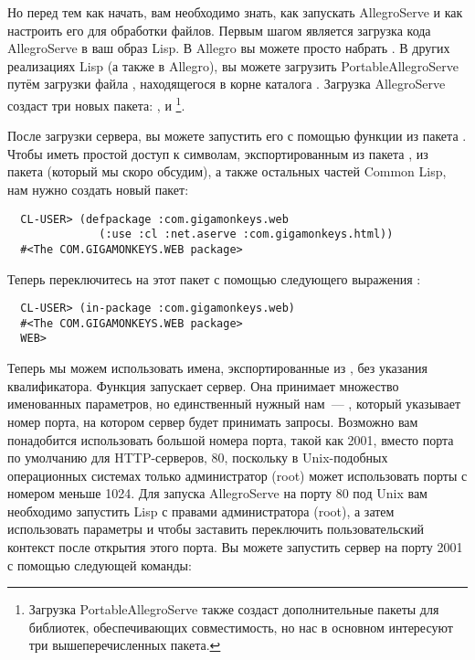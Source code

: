 Но перед тем как начать, вам необходимо знать, как запускать AllegroServe и как настроить
его для обработки файлов. Первым шагом является загрузка кода AllegroServe в ваш образ
Lisp. В Allegro вы можете просто набрать . В других реализациях
Lisp (а также в Allegro), вы можете загрузить PortableAllegroServe путём загрузки файла
, находящегося в корне каталога . Загрузка
AllegroServe создаст три новых пакета: ,  и
\footnote{Загрузка PortableAllegroServe также создаст
  дополнительные пакеты для библиотек, обеспечивающих совместимость, но нас в основном
  интересуют три вышеперечисленных пакета.}.

После загрузки сервера, вы можете запустить его с помощью функции  из пакета
. Чтобы иметь простой доступ к символам, экспортированным из пакета
, из пакета  (который мы скоро обсудим), а
также остальных частей Common Lisp, нам нужно создать новый пакет:

\begin{lstlisting}
  CL-USER> (defpackage :com.gigamonkeys.web
              (:use :cl :net.aserve :com.gigamonkeys.html))
  #<The COM.GIGAMONKEYS.WEB package>
\end{lstlisting}

Теперь переключитесь на этот пакет с помощью следующего выражения :

\begin{lstlisting}
  CL-USER> (in-package :com.gigamonkeys.web)
  #<The COM.GIGAMONKEYS.WEB package>
  WEB>
\end{lstlisting} 

Теперь мы можем использовать имена, экспортированные из , без указания
квалификатора. Функция  запускает сервер. Она принимает множество именованных
параметров, но единственный нужный нам~--- , который указывает номер порта, на
котором сервер будет принимать запросы.  Возможно вам понадобится использовать большой
номера порта, такой как 2001, вместо порта по умолчанию для HTTP-серверов, 80, поскольку в
Unix-подобных операционных системах только администратор (root) может использовать порты с
номером меньше 1024. Для запуска AllegroServe на порту 80 под Unix вам необходимо
запустить Lisp с правами администратора (root), а затем использовать параметры
 и  чтобы заставить  переключить пользовательский
контекст после открытия этого порта. Вы можете запустить сервер на порту 2001 с помощью
следующей команды:

